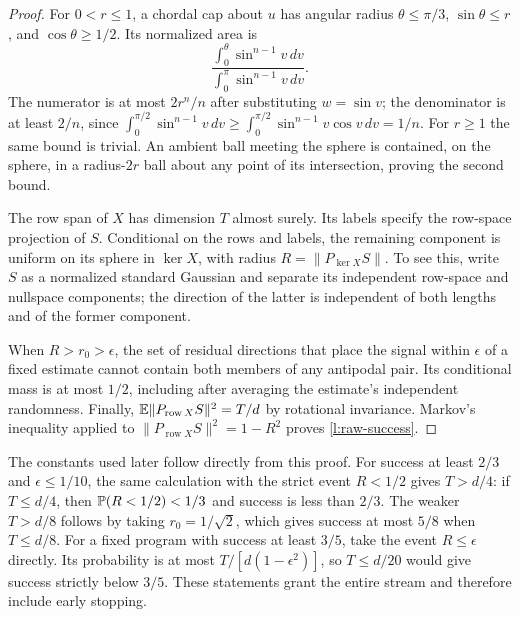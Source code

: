 \begin{proof}
For \(0<r\le1\), a chordal cap about \(u\) has angular radius
\(\theta\le\pi/3\), \(\sin\theta\le r\), and
\(\cos\theta\ge1/2\). Its normalized area is
\[
 \frac{\int_0^\theta\sin^{n-1}v\,dv}
      {\int_0^\pi\sin^{n-1}v\,dv}.
\]
The numerator is at most \(2r^n/n\) after substituting
\(w=\sin v\); the denominator is at least \(2/n\), since
\(\int_0^{\pi/2}\sin^{n-1}v\,dv
\ge\int_0^{\pi/2}\sin^{n-1}v\cos v\,dv=1/n\).
For \(r\ge1\) the same bound is trivial. An ambient ball meeting the
sphere is contained, on the sphere, in a radius-\(2r\) ball about
any point of its intersection, proving the second bound.

The row span of \(X\) has dimension \(T\) almost surely. Its labels
specify the row-space projection of \(S\). Conditional on the rows
and labels, the remaining component is uniform on its sphere in
\(\ker X\), with radius \(R=\|P_{\ker X}S\|\). To see this, write
\(S\) as a normalized standard Gaussian and separate its independent
row-space and nullspace components; the direction of the latter is
independent of both lengths and of the former component.

When \(R>r_0>\epsilon\), the set of residual directions that place
the signal within \(\epsilon\) of a fixed estimate cannot contain
both members of any antipodal pair. Its conditional mass is at most
\(1/2\), including after averaging the estimate's independent
randomness. Finally,
\(\mathbb E\|P_{\operatorname{row}X}S\|^2=T/d\) by rotational
invariance. Markov's inequality applied to
\(\|P_{\operatorname{row}X}S\|^2=1-R^2\) proves
\eqref{l:raw-success}.
\end{proof}

The constants used later follow directly from this proof. For success
at least \(2/3\) and \(\epsilon\le1/10\), the same calculation with
the strict event \(R<1/2\) gives \(T>d/4\): if \(T\le d/4\),
then \(\mathbb P(R<1/2)<1/3\) and success is less than \(2/3\).
The weaker \(T>d/8\) follows by taking \(r_0=1/\sqrt2\), which
gives success at most \(5/8\) when \(T\le d/8\).
For a fixed program with success at least \(3/5\), take the event
\(R\le\epsilon\) directly. Its probability is at most
\(T/[d(1-\epsilon^2)]\), so \(T\le d/20\) would give success
strictly below \(3/5\). These statements grant the entire stream
and therefore include early stopping.
